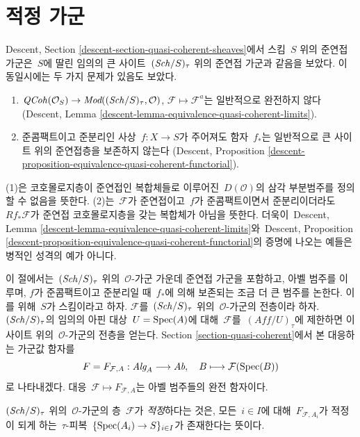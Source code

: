 \section{적정 가군}
\label{section-adequate}

\noindent
Descent, Section \ref{descent-section-quasi-coherent-sheaves}에서
스킴\  $S$ 위의 준연접 가군은\  $S$에 딸린 임의의 큰 사이트\ 
$(\mathit{Sch}/S)_\tau$ 위의 준연접 가군과 같음을 보았다. 이 동일시에는
두 가지 문제가 있음도 보았다.
\begin{enumerate}
\item $\mathit{QCoh}(\mathcal{O}_S) \to
\textit{Mod}((\mathit{Sch}/S)_\tau, \mathcal{O})$,
$\mathcal{F} \mapsto \mathcal{F}^a$는 일반적으로 완전하지 않다
(Descent, Lemma \ref{descent-lemma-equivalence-quasi-coherent-limits}).
\item 준콤팩트이고 준분리인 사상\  $f : X \to S$가 주어져도
함자\  $f_*$는 일반적으로 큰 사이트 위의 준연접층을 보존하지 않는다
(Descent, Proposition
\ref{descent-proposition-equivalence-quasi-coherent-functorial}).
\end{enumerate}
(1)은 코호몰로지층이 준연접인 복합체들로 이루어진\  $D(\mathcal{O})$의
삼각 부분범주를 정의할 수 없음을 뜻한다. (2)는\  $\mathcal{F}$가
준연접이고\  $f$가 준콤팩트이면서 준분리이더라도\ 
$Rf_*\mathcal{F}$가 준연접 코호몰로지층을 갖는 복합체가 아님을 뜻한다.
더욱이\  Descent, Lemma
\ref{descent-lemma-equivalence-quasi-coherent-limits}와\ 
Descent, Proposition
\ref{descent-proposition-equivalence-quasi-coherent-functorial}의
증명에 나오는 예들은 병적인 성격의 예가 아니다.

\medskip\noindent
이 절에서는\  $(\mathit{Sch}/S)_\tau$ 위의\  $\mathcal{O}$-가군 가운데
준연접 가군을 포함하고, 아벨 범주를 이루며, $f$가 준콤팩트이고
준분리일 때\  $f_*$에 의해 보존되는 조금 더 큰 범주를 논한다.
이를 위해\  $S$가 스킴이라고 하자. $\mathcal{F}$를\ 
$(\mathit{Sch}/S)_\tau$ 위의\  $\mathcal{O}$-가군의 전층이라 하자.
$(\mathit{Sch}/S)_\tau$의 임의의 아핀 대상\  $U = \mathop{\mathrm{Spec}}(A)$에 대해\ 
$\mathcal{F}$를\  $(\textit{Aff}/U)_\tau$에 제한하면 이 사이트 위의\ 
$\mathcal{O}$-가군의 전층을 얻는다. Section
\ref{section-quasi-coherent}에서 본 대응하는 가군값 함자를
$$
F = F_{\mathcal{F}, A} :
\textit{Alg}_A \longrightarrow \textit{Ab},
\quad
B \longmapsto \mathcal{F}(\mathop{\mathrm{Spec}}(B))
$$
로 나타내겠다. 대응\  $\mathcal{F} \mapsto F_{\mathcal{F}, A}$는
아벨 범주들의 완전 함자이다.

\begin{definition}
\label{definition-adequate}
$(\mathit{Sch}/S)_\tau$ 위의\  $\mathcal{O}$-가군의 층\  $\mathcal{F}$가
{\it 적정}하다는 것은, 모든\  $i \in I$에 대해\ 
$F_{\mathcal{F}, A_i}$가 적정이 되게 하는\  $\tau$-피복\ 
$\{\mathop{\mathrm{Spec}}(A_i) \to S\}_{i \in I}$가 존재한다는 뜻이다.
\end{definition}

